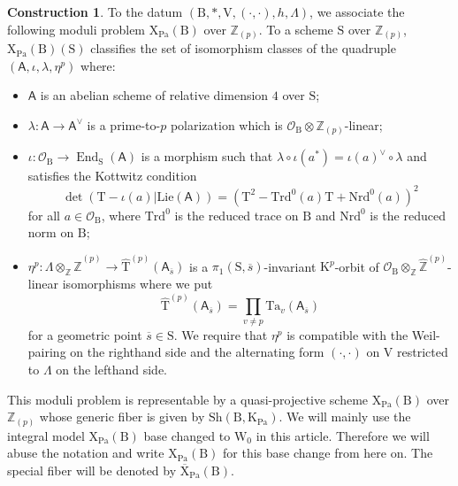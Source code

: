 \documentclass[10pt]{amsart}
\numberwithin{equation}{section}
\theoremstyle{definition}
\newtheorem{construction}[equation]{Construction}
\def\Lie{\mathrm{Lie}}
\def\Pa{\mathrm{Pa}}
\def\Ta{\mathrm{Ta}}
\DeclareMathOperator{\End}{End}
\def\calO{\mathcal{O}}
\def\ZZ{\mathbb{Z}}
\def\sfA{\mathsf{A}}
\def\rmB{\mathrm{B}}
\def\rmK{\mathrm{K}}
\def\rmV{\mathrm{V}}
\def\rmW{\mathrm{W}}
\def\rmS{\mathrm{S}}
\def\rmX{\mathrm{X}}
\def\rmT{\mathrm{T}}
\def\Sh{\mathrm{Sh}}
\begin{document}
\begin{construction}
To the datum $(\rmB,\ast,  \rmV, (\cdot,\cdot), h ,\Lambda)$, we associate the following moduli problem $\rmX_{\Pa}(\rmB)$ over $\ZZ_{(p)}$. To a scheme $\rmS$ over $\ZZ_{(p)}$, $\rmX_{\Pa}(\rmB)(\rmS)$ classifies the set of isomorphism classes of the quadruple $(\sfA, \iota , \lambda, \eta^{p})$ where:
\begin{itemize}
\item $\mathsf{A}$ is an abelian scheme of relative dimension $4$ over $\rmS$;
\item  $\lambda: \mathsf{A}\rightarrow \sfA^{\vee}$ is a prime-to-$p$ polarization which is $\calO_{\rmB}\otimes\ZZ_{(p)}$-linear;
\item  $\iota: \calO_{\rmB} \rightarrow \End_{\rmS}(\sfA)$ is a morphism such that $\lambda\circ \iota(a^{*})= \iota(a)^{\vee}\circ\lambda$ and satisfies the Kottwitz condition 
\begin{equation*}
\det(\rmT-\iota(a)\vert \Lie(\sfA))=(\rmT^{2}-\mathrm{Trd}^{0}(a)\rmT+\mathrm{Nrd}^{0}(a))^{2}
\end{equation*}
for all $a\in \calO_{\rmB}$, where $\mathrm{Trd}^{0}$ is the reduced trace on $\rmB$ and $\mathrm{Nrd}^{0}$ is the reduced norm on $\rmB$;
\item $\eta^{p}: \Lambda\otimes_{\ZZ} {\widehat{\ZZ}}^{(p)} \rightarrow\widehat{\rmT}^{(p)}(\sfA_{\overline{s}})$ is a $\pi_{1}(\rmS,\overline{s})$-invariant $\rmK^{p}$-orbit of $\calO_{\rmB}\otimes_{\ZZ}\widehat{\ZZ}^{(p)}$-linear isomorphisms where we put
\begin{equation*}
\widehat{\rmT}^{(p)}(\sfA_{\overline{s}})=\prod_{v \neq p}\Ta_{v}(\sfA_{\overline{s}})
\end{equation*}
for a geometric point $\overline{s}\in\rmS$.
We require that $\eta^{p}$ is compatible with the Weil-pairing on the righthand side and the alternating form $(\cdot,\cdot)$ on $\rmV$ restricted to $\Lambda$ on the lefthand side.
\end{itemize}

This moduli problem is representable by a quasi-projective scheme $\rmX_{\Pa}(\rmB)$ over $\ZZ_{(p)}$ whose generic fiber is given by $\Sh(\rmB, \rmK_{\Pa})$. We will mainly use the integral model $\rmX_{\Pa}(\rmB)$ base changed to $\rmW_{0}$ in this article. Therefore we will abuse the notation and write $\rmX_{\Pa}(\rmB)$ for this base change from here on. The special fiber will be denoted by $\overline{\rmX}_{\Pa}(\rmB)$. 
\end{construction}
\end{document}
